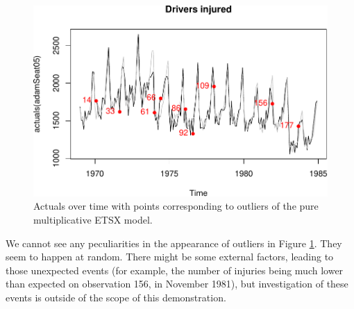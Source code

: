 \documentclass[]{book}
\newenvironment{Shaded}{\begin{snugshade}}{\end{snugshade}}
\newcommand{\CommentTok}[1]{\textcolor[rgb]{0.56,0.35,0.01}{\textit{#1}}}
\newcommand{\DataTypeTok}[1]{\textcolor[rgb]{0.13,0.29,0.53}{#1}}
\newcommand{\DecValTok}[1]{\textcolor[rgb]{0.00,0.00,0.81}{#1}}
\newcommand{\KeywordTok}[1]{\textcolor[rgb]{0.13,0.29,0.53}{\textbf{#1}}}
\newcommand{\NormalTok}[1]{#1}
\newcommand{\OperatorTok}[1]{\textcolor[rgb]{0.81,0.36,0.00}{\textbf{#1}}}
\newcommand{\StringTok}[1]{\textcolor[rgb]{0.31,0.60,0.02}{#1}}
\theoremstyle{definition}
\theoremstyle{definition}
\theoremstyle{definition}
\theoremstyle{definition}
\theoremstyle{remark}
\begin{document}
\begin{Shaded}
\end{Shaded}

\begin{figure}
\centering
\includegraphics{Svetunkov--2022----ADAM_files/figure-latex/adamSeat05Outliers-1.pdf}
\caption{\label{fig:adamSeat05Outliers}Actuals over time with points corresponding to outliers of the pure multiplicative ETSX model.}
\end{figure}

We cannot see any peculiarities in the appearance of outliers in Figure \ref{fig:adamSeat05Outliers}. They seem to happen at random. There might be some external factors, leading to those unexpected events (for example, the number of injuries being much lower than expected on observation 156, in November 1981), but investigation of these events is outside of the scope of this demonstration.
\end{document}
